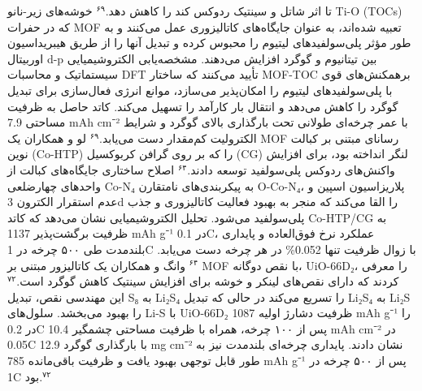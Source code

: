 \documentclass[12pt,a4paper,twocolumn]{article} %
\newcommand{\persian}[1]{\textfarsi{#1}}
\newcommand{\english}[1]{\textenglish{#1}}
\begin{document}
\persian{
تا اثر شاتل و سینتیک ردوکس کند را کاهش دهد.$^{۶۹}$ خوشه‌های زیر-نانو \english{Ti-O} (\english{TOCs}) که در حفرات \english{MOF} تعبیه شده‌اند، به عنوان جایگاه‌های کاتالیزوری عمل می‌کنند و به طور مؤثر پلی‌سولفیدهای لیتیوم را محبوس کرده و تبدیل آنها را از طریق هیبریداسیون اوربیتال \english{d-p} بین تیتانیوم و گوگرد افزایش می‌دهند. مشخصه‌یابی الکتروشیمیایی سیستماتیک و محاسبات \english{DFT} تأیید می‌کنند که ساختار \english{MOF-TOC} برهمکنش‌های قوی با پلی‌سولفیدهای لیتیوم را امکان‌پذیر می‌سازد، موانع انرژی فعال‌سازی برای تبدیل گوگرد را کاهش می‌دهد و انتقال بار کارآمد را تسهیل می‌کند. کاتد حاصل به ظرفیت مساحتی \english{7.9 mAh cm⁻²} با عمر چرخه‌ای طولانی تحت بارگذاری بالای گوگرد و شرایط الکترولیت کم‌مقدار دست می‌یابد.$^{۶۹}$
}
\persian{
لو و همکاران یک \english{MOF} رسانای مبتنی بر کبالت نوین (\english{Co-HTP}) را که بر روی گرافن کربوکسیل (\english{CG}) لنگر انداخته بود، برای افزایش واکنش‌های ردوکس پلی‌سولفید توسعه دادند.$^{۶۴}$ اصلاح ساختاری جایگاه‌های کبالت از واحدهای چهارضلعی \english{Co-N₄} به پیکربندی‌های نامتقارن \english{O-Co-N₄}، پلاریزاسیون اسپین و عدم استقرار الکترون \english{3d} را القا می‌کند که منجر به بهبود فعالیت کاتالیزوری و جذب پلی‌سولفید می‌شود. تحلیل الکتروشیمیایی نشان می‌دهد که کاتد \english{Co-HTP/CG} به ظرفیت برگشت‌پذیر \english{1137 mAh g⁻¹} در \english{0.1C}، عملکرد نرخ فوق‌العاده و پایداری بلندمدت طی ۵۰۰ چرخه در \english{1C} با زوال ظرفیت تنها \english{0.052\%} در هر چرخه دست می‌یابد.$^{۶۴}$
}
\persian{
وانگ و همکاران یک کاتالیزور مبتنی بر \english{MOF} با نقص دوگانه، \english{UiO-66D₂}، را معرفی کردند که دارای نقص‌های لینکر و خوشه برای افزایش سینتیک کاهش گوگرد است.$^{۷۲}$ این مهندسی نقص، تبدیل \english{S₈} به \english{Li₂S₄} را تسریع می‌کند در حالی که تبدیل \english{Li₂S₄} به \english{Li₂S} را بهبود می‌بخشد. سلول‌های \english{Li-S} با \english{UiO-66D₂} ظرفیت دشارژ اولیه \english{1087 mAh g⁻¹} را در \english{0.2C} پس از ۱۰۰ چرخه، همراه با ظرفیت مساحتی چشمگیر \english{10.4 mAh cm⁻²} در \english{0.05C} با بارگذاری گوگرد \english{12.9 mg cm⁻²} نشان دادند. پایداری چرخه‌ای بلندمدت نیز به طور قابل توجهی بهبود یافت و ظرفیت باقی‌مانده \english{785 mAh g⁻¹} پس از ۵۰۰ چرخه در \english{1C} بود.$^{۷۲}$
}
\end{document}
